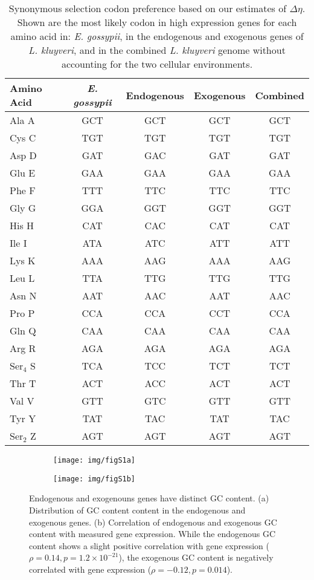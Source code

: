 \documentclass[doublespacing,linenumbers]{bmcart-modified}
\newcommand{\kluyveri}{\textit{L. kluyveri}\xspace}
\newcommand{\gossypii}{\textit{E. gossypii}\xspace}
\newcommand{\GC}{GC content\xspace}
\newcommand{\DE}{\ensuremath{{\Delta \eta}}\xspace}
\begin{document}
\begin{backmatter}
\begin{table}
    \centering
    \caption{Synonymous selection codon preference based on our estimates of $\DE$.
	 Shown are the most likely codon in high expression genes for each amino acid in: \gossypii, in the endogenous and exogenous genes of \kluyveri, and in the combined \kluyveri genome without accounting for the two cellular environments.}
\begin{tabular}{  l  c  c  c  c  }
\hline
	Amino Acid & \gossypii & Endogenous & Exogenous & Combined \\ \hline
	Ala A & GCT & GCT & GCT & GCT \\ 
	Cys C & TGT & TGT & TGT & TGT \\ 
	Asp D & GAT & GAC & GAT & GAT \\ 
	Glu E & GAA & GAA & GAA & GAA \\ 
	Phe F & TTT & TTC & TTC & TTC \\ 
	Gly G & GGA & GGT & GGT & GGT \\ 
	His H & CAT & CAC & CAT & CAT \\ 
	Ile I & ATA & ATC & ATT & ATT \\ 
	Lys K & AAA & AAG & AAA & AAG \\ 
	Leu L & TTA & TTG & TTG & TTG \\ 
	Asn N & AAT & AAC & AAT & AAC \\ 
	Pro P & CCA & CCA & CCT & CCA \\ 
	Gln Q & CAA & CAA & CAA & CAA \\ 
	Arg R & AGA & AGA & AGA & AGA \\ 
	Ser$_4$ S & TCA & TCC & TCT & TCT \\ 
	Thr T & ACT & ACC & ACT & ACT \\ 
	Val V & GTT & GTC & GTT & GTT \\ 
	Tyr Y & TAT & TAC & TAT & TAC \\ 
	Ser$_2$ Z & AGT & AGT & AGT & AGT \\ \hline
\end{tabular}
    \label{tab:codon_pref_deta}
\end{table}

\begin{figure}
    \centering
    \begin{subfigure}
        \centering
       \texttt{[image: img/figS1a]}
    \end{subfigure}
    \begin{subfigure}
        \centering
        \texttt{[image: img/figS1b]}
    \end{subfigure}
    \caption{Endogenous and exogenouns genes have distinct \GC. 
    (a) Distribution of \GC content in the endogenous and exogenous genes.
    (b) Correlation of endogenous and exogenous \GC with measured gene expression. 
    While the endogenous \GC shows a slight positive correlation with gene expression ($\rho = 0.14, p = 1.2\times10^{-21}$), the exogenous \GC is negatively correlated with gene expression ($\rho = -0.12, p = 0.014$).}
    \label{fig:gc_comp_phi}
\end{figure}
\null
\vfill



\end{backmatter}
\end{document}
